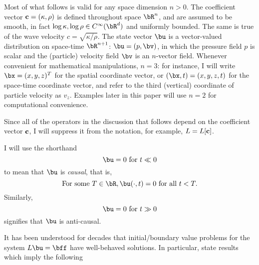Most of what follows is valid for any space dimension $n >0$. The
coefficient vector $\bf{c}=(\kappa,\rho)$ is defined throughout space
$\bR^n$, and are assumed to be smooth, in fact $\log \kappa, \log \rho \in C^{\infty}(\bR^d)$ and uniformly bounded. The same is true of the wave velocity $c = \sqrt{\kappa/\rho}$. The state vector $\bu$ is a vector-valued distribution on space-time
$\bR^{n+1}$: $\bu = (p,\bv)$, in which the pressure field $p$ is scalar and the (particle) velocity field $\bv$ is an $n$-vector field. Whenever convenient for mathematical manipulations,
$n=3$: for instance, I will write $\bx=(x,y,z)^T$ for the spatial
coordinate vector, or $(\bx,t) = (x,y,z,t)$ for the space-time coordinate vector, and refer to the third (vertical) coordinate of
particle velocity as $v_z$. Examples
later in this paper will use $n=2$ for computational convenience.

Since all of the operators in the discussion that follows depend on
the coefficient vector 
$\bf{c}$, I will suppress it from the notation, for example, $L=L[\bf{c}]$. 

 I will use the shorthand
\[
  \bu  = 0 \mbox{ for } t \ll 0 
\]
to mean that $\bu$ is {\em causal}, that is,
\[
  \mbox{For some } T \in \bR, \bu(\cdot,t) = 0 \mbox{ for all } t <
  T.
\]
Similarly,
\[
  \bu = 0 \mbox{ for } t \gg 0 
\]
signifies that $\bu$ is anti-causal.

It has been understood for decades that initial/boundary value problems for the system $L\bu=\bff$ have well-behaved solutions. In particular, \cite{BlazekStolkSymes:13} state results which imply the following

